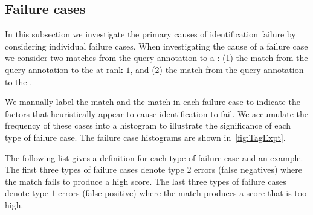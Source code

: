     \subsection{Failure cases}\label{sub:exptfail}  
        
        In this subsection we investigate the primary causes of identification failure by considering individual
          failure cases.
        When investigating the cause of a failure case we consider two matches from the query annotation to a
          \name{}:
        (1) the match from the query annotation to the \groundfalse{} \name{} at rank $1$, and
        (2) the match from the query annotation to the \groundtrue{} \name{}.

        We manually label the \groundtrue{} match and the \groundfalse{} match in each failure case to indicate
          the factors that heuristically appear to cause identification to fail.
        We accumulate the frequency of these cases into a histogram to illustrate the significance of each type
          of failure case.
        The failure case histograms are shown in~\cref{fig:TagExpt}.

        \TagExpt{}

        The following list gives a definition for each type of failure case and an example.
        The first three types of failure cases denote type 2 errors (false negatives) where the \groundtrue{}
          match fails to produce a high score.
        The last three types of failure cases denote type $1$ errors (false positive) where the \groundfalse{}
          match produces a score that is too high.

